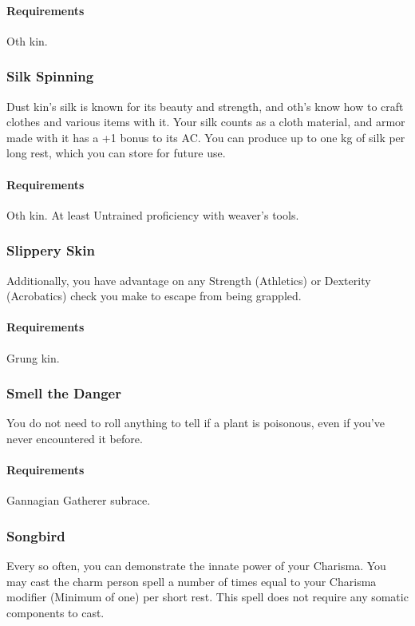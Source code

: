     \paragraph{Requirements} Oth kin.
\subsubsection{Silk Spinning} \label{feat::silkspinning}
    Dust kin's silk is known for its beauty and strength, and oth's know how to craft clothes and various items with it.
    Your silk counts as a cloth material, and armor made with it has a +1 bonus to its AC.
    You can produce up to one kg of silk per long rest, which you can store for future use.
    \paragraph{Requirements} Oth kin. At least Untrained proficiency with weaver's tools.
\subsubsection{Slippery Skin} \label{feat::slipperyskin}
    Additionally, you have advantage on any Strength (Athletics) or Dexterity (Acrobatics) check you make to escape from being grappled.
    \paragraph{Requirements} Grung kin.
\subsubsection{Smell the Danger} \label{feat::smellthedanger}
    You do not need to roll anything to tell if a plant is poisonous, even if you've never encountered it before.
    \paragraph{Requirements} Gannagian Gatherer subrace.
\subsubsection{Songbird} \label{feat::songbird}
    Every so often, you can demonstrate the innate power of your Charisma.
    You may cast the charm person spell a number of times equal to your Charisma modifier (Minimum of one) per short rest.
    This spell does not require any somatic components to cast.

